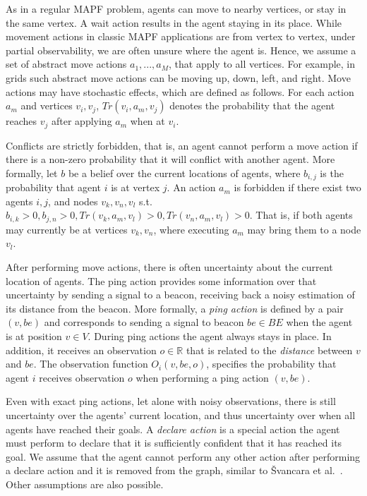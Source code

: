 \documentclass[letterpaper]{article} %
\newcommand{\shortcite}[1]{{\cite{#1}}}
\begin{document}
 As in a regular MAPF problem, agents can move to nearby vertices, or stay in the same vertex.
A wait action results in the agent staying in its place.
While movement actions in classic MAPF applications are from vertex to vertex, under partial observability, we are often unsure where the agent is. Hence, we assume a set of abstract move actions $a_1,...,a_M$, that apply to all vertices.
For example, in grids such abstract move actions can be moving up, down, left, and right.
Move actions may have stochastic effects, which are defined as follows.
For each action $a_m$ and vertices $v_i,v_j$, $Tr(v_i,a_m,v_j)$ denotes the probability that the agent reaches $v_j$ after applying $a_m$ when at $v_i$.


Conflicts are strictly forbidden, that is, an agent cannot perform a move action if there is a non-zero probability that it will conflict with another agent.  More formally, let $b$ be a belief over the current locations of agents, where $b_{i,j}$ is the probability that agent $i$ is at vertex $j$.
An action $a_m$ is forbidden if there exist two agents $i,j$, and nodes $v_{k},v_{n},v_{l}$ s.t.
$b_{i,k}>0, b_{j,n}>0, Tr(v_k,a_m,v_l)>0, Tr(v_n,a_m,v_l)>0 $. That is, if both agents may currently be at vertices $v_k,v_n$, where executing $a_m$ may bring them to a node $v_l$.



 After performing move actions, there is often uncertainty about the current location of agents. The ping action provides some information over that uncertainty by sending a signal to a beacon, receiving back a noisy estimation of its distance from the beacon.
More formally, a \emph{ping action} is defined by a pair $(v,be)$ and corresponds to sending a signal to beacon $be\in BE$ when the agent is at position $v\in V$. During ping actions the agent always stays in place.
In addition, it receives an observation $o\in\mathbb{R}$ that is related to the \emph{distance} between $v$ and $be$. The  observation function $O_i(v,be,o)$, specifies the probability that agent $i$ receives observation $o$ when performing a ping action $(v,be)$.

Even with exact ping actions, let alone with noisy observations, there is still uncertainty over the agents' current location, and thus uncertainty over when all agents have reached their goals.
A \emph{declare action} is a special action the agent must perform to declare that it is sufficiently confident that it has reached its goal. We assume that the agent cannot perform any other action after performing a declare action and it is removed from the graph, similar to  {\v{S}}vancara et al.~\shortcite{vsvancara2019online}. Other assumptions are also possible.
\end{document}
